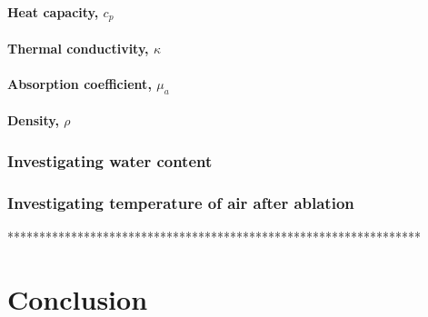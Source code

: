 \paragraph{Heat capacity, $c_p$}
\paragraph{Thermal conductivity, $\kappa$}
\paragraph{Absorption coefficient, $\mu_a$}
\paragraph{Density, $\rho$}


\subsubsection{Investigating water content}
 
\subsubsection{Investigating temperature of air after ablation}  
*****************************************************************
\section{Conclusion}